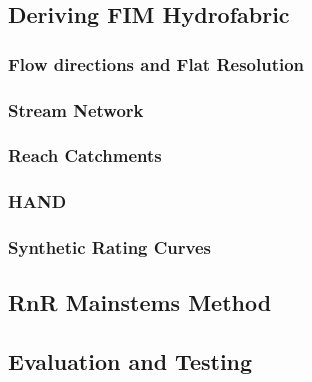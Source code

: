\subsection{Deriving FIM Hydrofabric}

\subsubsection{Flow directions and Flat Resolution}
\cite{survila2016scalable,tarboton1997new,wallis2009parallel}

\subsubsection{Stream Network}
\cite{wallis2009parallel}

\subsubsection{Reach Catchments}

\subsubsection{HAND}

\subsubsection{Synthetic Rating Curves}

\subsection{RnR Mainstems Method}

\subsection{Evaluation and Testing}

